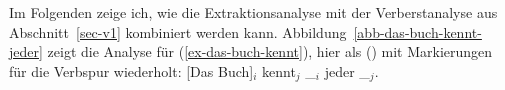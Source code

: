 Im Folgenden zeige ich, wie die Extraktionsanalyse
mit der Verberstanalyse aus Abschnitt~\ref{sec-v1} kombiniert werden kann.
Abbildung~\vref{abb-das-buch-kennt-jeder} zeigt die Analyse für (\ref{ex-das-buch-kennt}),
hier als () mit Markierungen für die Verbspur wiederholt:
\ea
{}[Das Buch]$_i$ kennt$_j$  \_$_i$ jeder \_$_j$.
\z
\largerpage
\begin{figure}

\end{figure}
